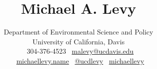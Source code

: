 \documentclass[11pt, letter]{article}
\title{Michael A. Levy}
\author{Department of Environmental Science and Policy\\
University of California, Davis\\ 
\faMobilePhone~304-376-4523 \textbar{} \faEnvelope~\href{mailto:malevy@ucdavis.edu}{malevy@ucdavis.edu}\\
\faLaptop~\href{http://michaellevy.name}{michaellevy.name} \textbar{} \faTwitter~\href{http://twitter.com/ucdlevy}{@ucdlevy} \textbar{} \faGithub~\href{https://github.com/michaellevy}{michaellevy}
}
\date{} %
\begin{document}
\maketitle
\begin{raggedright}
\vspace{-15mm}



\end{raggedright}
\end{document}
